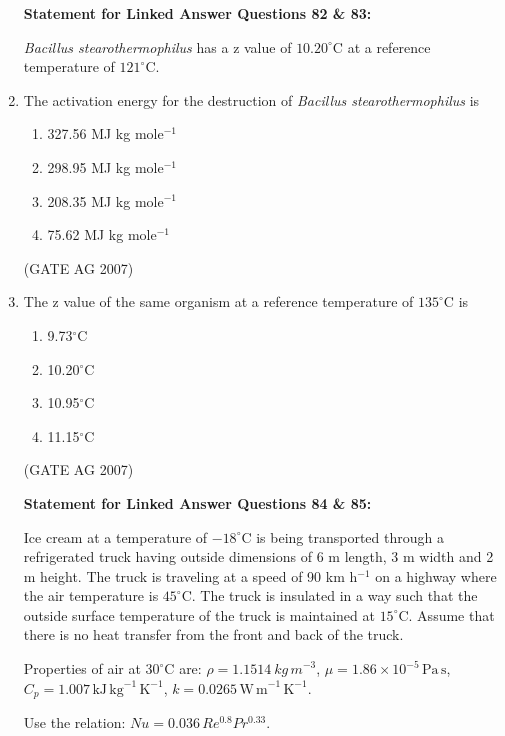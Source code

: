 \documentclass[journal,12pt,onecolumn]{IEEEtran}
\theoremstyle{remark}
\begin{document}
\begin{enumerate}
\textbf{Statement for Linked Answer Questions 82 \& 83:}

\textit{Bacillus stearothermophilus} has a z value of $10.20^\circ$C at a reference temperature of $121^\circ$C.

\item The activation energy for the destruction of \textit{Bacillus stearothermophilus} is

\begin{multicols}{4}
\begin{enumerate}
\item 327.56 MJ kg mole$^{-1}$
\item 298.95 MJ kg mole$^{-1}$
\item 208.35 MJ kg mole$^{-1}$
\item 75.62 MJ kg mole$^{-1}$
\end{enumerate}
\end{multicols}
\hfill(GATE AG 2007)


\item The z value of the same organism at a reference temperature of $135^\circ$C is

\begin{multicols}{4}
\begin{enumerate}
\item 9.73$^\circ$C
\item 10.20$^\circ$C
\item 10.95$^\circ$C
\item 11.15$^\circ$C
\end{enumerate}
\end{multicols}
\hfill(GATE AG 2007)

\textbf{Statement for Linked Answer Questions 84 \& 85:}

Ice cream at a temperature of $-18^\circ$C is being transported through a refrigerated truck having outside dimensions of 6 m length, 3 m width and 2 m height. The truck is traveling at a speed of 90 km h$^{-1}$ on a highway where the air temperature is $45^\circ$C. The truck is insulated in a way such that the outside surface temperature of the truck is maintained at $15^\circ$C. Assume that there is no heat transfer from the front and back of the truck.

Properties of air at $30^\circ$C are: $\rho = 1.1514\mathrm\ {kg\,m}^{-3}$, $\mu = 1.86\times 10^{-5}\,\mathrm{Pa\,s}$, $C_p = 1.007\,\mathrm{kJ\,kg}^{-1}\,\mathrm{K}^{-1}$, $k = 0.0265\,\mathrm{W\,m}^{-1}\,\mathrm{K}^{-1}$.

Use the relation: $Nu = 0.036\,Re^{0.8} Pr^{0.33}$.



\end{enumerate}
\end{document}

